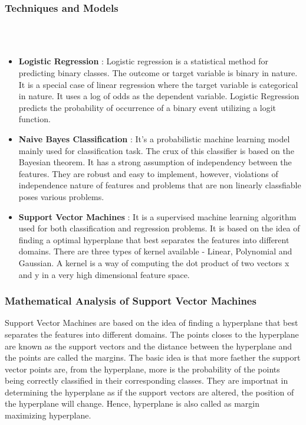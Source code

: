 \documentclass{article}
\begin{document}
\subsubsection {\color{brown} \textbf{Techniques and Models}}
\\ \\
\begin{itemize}
    \item \textbf{Logistic Regression} :
 Logistic regression is a statistical method for predicting binary classes. The outcome or target variable is binary in nature. It is a special case of linear regression where the target variable is categorical in nature. It uses a log of odds as the dependent variable. Logistic Regression predicts the probability of occurrence of a binary event utilizing a logit function. 
 
\item \textbf{Naive Bayes Classification} : It's a probabilistic machine learning model mainly used for classification task. The crux of this classifier is based on the Bayesian theorem. It has a strong assumption of independency between the features. They are robust and easy to implement, however, violations of independence nature of features and problems that are non linearly classfiable poses various problems. 
 
\item \textbf{Support Vector Machines} : It is a supervised machine learning algorithm used for both classification and regression problems. It is based on the idea of finding a optimal hyperplane that best separates the features into different domains. There are three types of kernel available - Linear, Polynomial and Gaussian. A kernel is a way of computing the dot product of two vectors x and y in a very high dimensional feature space.
\end{itemize}

\subsubsection  {\color{brown} \textbf{Mathematical Analysis of Support Vector Machines}} 

Support Vector Machines are based on the idea of finding a hyperplane that best separates the features into different domains. The points closes to the hyperplane are known as the support vectors and the distance between the hyperplane and the points are called the margins. The basic idea is that more faether the support vector points are, from the hyperplane, more is the probability of the points being correctly classified in their corresponding classes. They are importnat in determining the hyperplane as if the support vectors are altered, the position of the hyperplane will change. Hence, hyperplane is also called as margin maximizing hyperplane. \\
\end{document}

